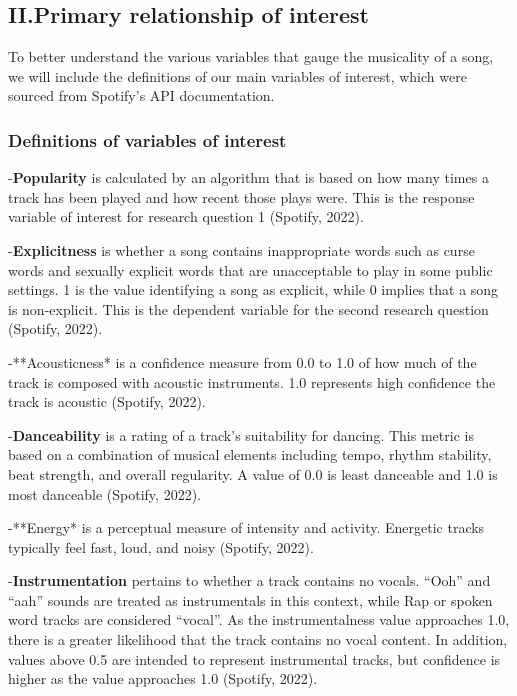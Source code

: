 \documentclass[
]{article}
\begin{document}
\hypertarget{ii.primary-relationship-of-interest}{%
\subsection{II.Primary relationship of
interest}\label{ii.primary-relationship-of-interest}}

To better understand the various variables that gauge the musicality of
a song, we will include the definitions of our main variables of
interest, which were sourced from Spotify's API documentation.

\hypertarget{definitions-of-variables-of-interest}{%
\subsubsection{Definitions of variables of
interest}\label{definitions-of-variables-of-interest}}

-\textbf{Popularity} is calculated by an algorithm that is based on how
many times a track has been played and how recent those plays were. This
is the response variable of interest for research question 1 (Spotify,
2022).

-\textbf{Explicitness} is whether a song contains inappropriate words
such as curse words and sexually explicit words that are unacceptable to
play in some public settings. 1 is the value identifying a song as
explicit, while 0 implies that a song is non-explicit. This is the
dependent variable for the second research question (Spotify, 2022).

-**Acousticness* is a confidence measure from 0.0 to 1.0 of how much of
the track is composed with acoustic instruments. 1.0 represents high
confidence the track is acoustic (Spotify, 2022).

-\textbf{Danceability} is a rating of a track's suitability for dancing.
This metric is based on a combination of musical elements including
tempo, rhythm stability, beat strength, and overall regularity. A value
of 0.0 is least danceable and 1.0 is most danceable (Spotify, 2022).

-**Energy* is a perceptual measure of intensity and activity. Energetic
tracks typically feel fast, loud, and noisy (Spotify, 2022).

-\textbf{Instrumentation} pertains to whether a track contains no
vocals. ``Ooh'' and ``aah'' sounds are treated as instrumentals in this
context, while Rap or spoken word tracks are considered ``vocal''. As
the instrumentalness value approaches 1.0, there is a greater likelihood
that the track contains no vocal content. In addition, values above 0.5
are intended to represent instrumental tracks, but confidence is higher
as the value approaches 1.0 (Spotify, 2022).
\end{document}
